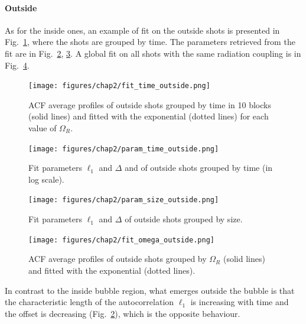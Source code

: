 \paragraph{Outside}
As for the inside ones, an example of fit on the outside shots is presented in Fig.\ \ref{fig:fit_time_outside}, where the shots are grouped by time. The parameters retrieved from the fit are in Fig.\ \ref{fig:param_time_outside}, \ref{fig:param_size_outside}. A global fit on all shots with the same radiation coupling is in Fig.\ \ref{fig:fit_omega_outside}.
\begin{figure}[h!]
    \centering
    \texttt{[image: figures/chap2/fit\_time\_outside.png]}
    \caption{ACF average profiles of outside shots grouped by time in 10 blocks (solid lines) and fitted with the exponential (dotted lines) for each value of $\Omega_R$.}
    \label{fig:fit_time_outside}
\end{figure}
\begin{figure}[h!]
    \centering
    \texttt{[image: figures/chap2/param\_time\_outside.png]}
    \caption{Fit parameters $\ell_1$ and $\Delta$ and of outside shots grouped by time (in log scale).}
    \label{fig:param_time_outside}
\end{figure}
\begin{figure}[h!]
    \centering
    \texttt{[image: figures/chap2/param\_size\_outside.png]}
    \caption{Fit parameters $\ell_1$ and $\Delta$ of outside shots grouped by size.}
    \label{fig:param_size_outside}
\end{figure}
\begin{figure}[h!]
    \centering
    \texttt{[image: figures/chap2/fit\_omega\_outside.png]}
    \caption{ACF average profiles of outside shots grouped by $\Omega_R$ (solid lines) and fitted with the exponential (dotted lines).}
    \label{fig:fit_omega_outside}
\end{figure}
In contrast to the inside bubble region, what emerges outside the bubble is that the characteristic length of the autocorrelation $\ell_1$ is increasing with time and the offset is decreasing (Fig.\ \ref{fig:param_time_outside}), which is the opposite behaviour.

